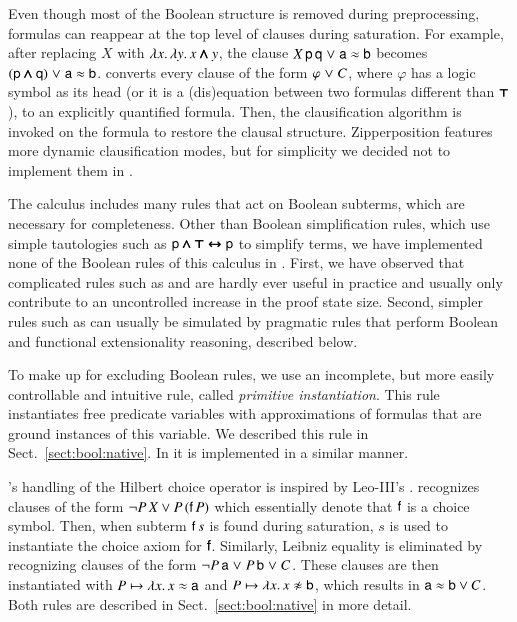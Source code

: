    Even though most of the Boolean structure is
  removed during preprocessing, formulas can reappear at the top level of
  clauses during saturation. For example, after replacing $X$ with $\lambda x.
  \, \lambda y.\, x \pmb{\land} y$, the clause $X \, \mathsf{p} \, \mathsf{q} \mathrel\lor \mathsf{a}
  \approx \mathsf{b}$ becomes $(\mathsf{p} \pmb{\land} \mathsf{q}) \mathrel\lor \mathsf{a} \approx \mathsf{b}$. \ehohii{}
  converts every clause of the form $\varphi \mathrel\lor C$, where $\varphi$ has a logic symbol
  as its head (or it is a (dis)equation between two formulas different than $\pmb{\top}$),
  to an explicitly quantified formula. Then, the clausification algorithm
  is invoked on the formula to restore the clausal structure. Zipperposition features
  more dynamic clausification modes, but for simplicity we decided
  not to implement them in \ehohii{}.
  
  The \osup{} calculus
  \cite{bbtv-21-full-ho-sup} includes many rules that act on Boolean subterms,
  which are necessary for completeness. Other than Boolean simplification rules,
  which use simple tautologies such as $\mathsf{p} \pmb{\land} \pmb{\top} \pmb{\leftrightarrow}\mathsf{p}$ to simplify terms, we
  have implemented none of the Boolean rules of this calculus in \ehohii{}. First, we have
  observed that complicated rules such as  and
   are hardly ever useful in practice and usually only
  contribute to an uncontrolled increase in the proof state size. Second, simpler
  rules such as  can usually be simulated by pragmatic rules
  that perform Boolean and functional extensionality reasoning, described below.
  
  To make up for excluding Boolean rules, we use an incomplete, but more
  easily controllable and intuitive rule, called \emph{primitive instantiation}. This
  rule instantiates free predicate variables with approximations of formulas
  that are ground instances of this variable. We described this rule in Sect.~\ref{sect:bool:native}.
  In \ehohii{} it is implemented in a similar manner.
  
  \ehohii{}'s handling of the Hilbert choice operator is inspired by Leo-III's
  \cite{sb-21-leo3}. \ehohii{}
  recognizes clauses of the form $\neg P \, X \lor P \, (\mathsf{f} \, P)$ which
  essentially denote that $\mathsf{f}$ is a choice symbol. Then, when subterm
  $\mathsf{f} \, s$ is found during saturation, $s$ is used to instantiate the choice
  axiom for $\mathsf{f}$. 
  Similarly, Leibniz equality is eliminated by
  recognizing clauses of the form  $\neg P \, \mathsf{a} \mathrel\lor P \, \mathsf{b} \mathrel\lor C$. These clauses are then
  instantiated with $P \mapsto \lambda x. \, x \approx \mathsf{a}$ and $P \mapsto \lambda
  x. \, x\noteq\cst{b}$, which results in $\mathsf{a} \approx \mathsf{b} \lor C$. Both rules
  are described in Sect.~\ref{sect:bool:native} in more detail.
  
